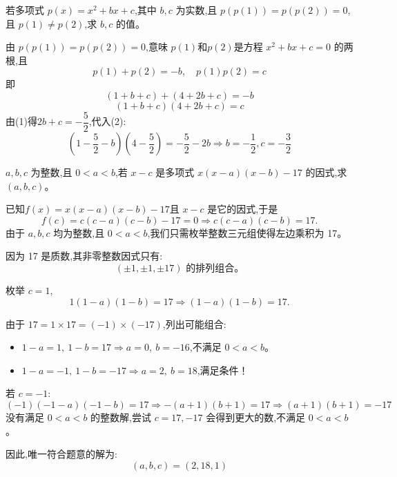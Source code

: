 \begin{questions}
    \question 若多项式 $p(x) = x^2 + b x + c$,其中 $b,c$ 为实数,且 $p(p(1)) = p(p(2)) = 0$,且 $p(1) \neq p(2)$,求 $b,c$ 的值。 
    \begin{solution}
        由 \(p(p(1)) =p(p(2)) = 0\),意味 \(p(1)\)和\(p(2) \)是方程 \(x^2 + bx + c = 0\) 的两根,且
        \[
        p(1)+p(2) = -b,\quad p(1)p(2) = c
        \]
        即
        \[
         (1 + b + c) + (4+2b+c)=-b \tag{1}
        \]
        \[
         (1 + b + c)(4+2b+c)=c \tag{2}
        \]
        由(1)得$2b+c = -\dfrac{5}{2} $,代入(2):
        \[
        (1 - \frac{5}{2} - b)(4  - \frac{5}{2}) = -\frac{5}{2} - 2b \Rightarrow  b = -\frac{1}{2},c=-\frac{3}{2}
        \]
    \end{solution}
    
    \question $a,b,c$ 为整数,且 $0 < a < b$,若 $x - c$ 是多项式 $x(x-a)( x - b) - 17$ 的因式,求 $(a,b,c)$。 
    \begin{solution}
        已知$f(x) = x(x - a)(x - b) - 17$且 \(x - c\) 是它的因式,于是
        \[
        f(c) = c(c - a)(c - b) - 17 = 0 \Rightarrow c(c - a)(c - b) = 17.
        \]
        由于 \(a, b, c\) 均为整数,且 \(0 < a < b\),我们只需枚举整数三元组使得左边乘积为 17。
    
        因为 17 是质数,其非零整数因式只有:
        \[
        (\pm1, \pm1, \pm17) \text{ 的排列组合。}
        \]
    
        枚举 \(c = 1\),
        \[
        1(1 - a)(1 - b) = 17 \Rightarrow (1 - a)(1 - b) = 17.
        \]
    
        由于 \(17 = 1 \times 17 = (-1)\times(-17)\),列出可能组合:
        \begin{itemize}
            \item \(1 - a = 1,\ 1 - b = 17 \Rightarrow a = 0,\ b = -16\),不满足 \(0 < a < b\)。
            \item \(1 - a = -1,\ 1 - b = -17 \Rightarrow a = 2,\ b = 18\),满足条件！
        \end{itemize}
    
        若 \(c = -1\):
        \[
        (-1)(-1 - a)(-1 - b) = 17 \Rightarrow -(a + 1)(b + 1) = 17
        \Rightarrow (a + 1)(b + 1) = -17
        \]
        没有满足 \(0 < a < b\) 的整数解,尝试 \(c = 17, -17\) 会得到更大的数,不满足 \(0 < a < b\)。
    
        因此,唯一符合题意的解为:
        \[
        (a, b, c) = (2, 18, 1)
        \]
    \end{solution}


\end{questions}
